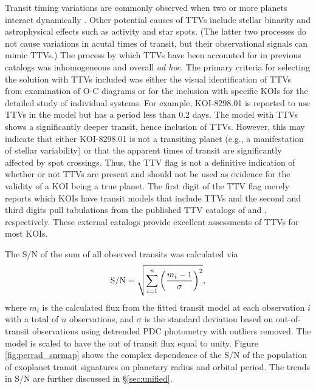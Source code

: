 \documentclass{aastex62}
\begin{document}
Transit timing variations are commonly observed when two or more planets interact dynamically \citep{Agol:2005,Holman:2005}.  Other potential causes of TTVs include stellar binarity and astrophysical effects such as activity and star spots. (The latter two processes do not cause variations in acutal times of transit, but their observational signals can mimic TTVs.) The process by which TTVs have been accounted for in previous catalogs was inhomogeneous and overall {\it ad hoc}.  The primary criteria for selecting the solution with TTVs included was either the visual identification of TTVs from examination of O-C diagrams or for the inclusion with specific KOIs for the detailed study of individual systems.  For example, KOI-8298.01 is reported to use TTVs in the model but has a period less than 0.2 days.  The model with TTVs shows a significantly deeper transit, hence inclusion of TTVs.  However, this may indicate that either KOI-8298.01 is not a transiting planet (e.g., a manifestation of stellar variability) or that the apparent times of transit are significantly affected by spot crossings.  Thus, the TTV flag is not a definitive indication of whether or not TTVs are present and should not be used as evidence for the validity of a KOI being a true planet.  
The first digit of the TTV flag merely reports which KOIs have transit models that include TTVs and the second and third digits pull tabulations from the published TTV catalogs of \cite{Holczer:2016} and \cite{Kane:2019}, respectively. These external catalogs provide excellent assessments of TTVs for most KOIs.  

The S/N of the sum of all observed transits was calculated via
\begin{equation}\label{eq:S/N}
    {\rm S/N} = \sqrt{\sum^n_{i=1}\left ( \frac{m_i - 1}{\sigma}  \right )^2 },
\end{equation}
where $m_i$ is the calculated flux from the fitted transit model at each observation $i$ with a total of $n$ observations, and $\sigma$ is the standard deviation {based on out-of-transit observations using detrended PDC photometry with outliers removed}. The model is scaled to have the out of transit flux equal to unity.  Figure \ref{fig:perrad_snrmap} shows the complex dependence of the S/N of the population of exoplanet transit signatures on planetary radius and orbital period.  The trends in S/N are further discussed in \S\ref{sec:unified}.
\end{document}
